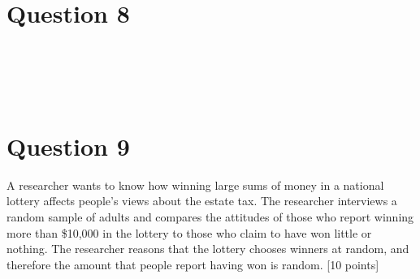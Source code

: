 \documentclass[11pt,notitlepage]{article}\usepackage[]{graphicx}\usepackage[]{color}
\makeatletter
\newenvironment{kframe}{%
 \def\at@end@of@kframe{}%
 \ifinner\ifhmode%
  \def\at@end@of@kframe{\end{minipage}}%
  \begin{minipage}{\columnwidth}%
 \fi\fi%
 \def\FrameCommand##1{\hskip\@totalleftmargin \hskip-\fboxsep
 \colorbox{shadecolor}{##1}\hskip-\fboxsep
     \hskip-\linewidth \hskip-\@totalleftmargin \hskip\columnwidth}%
 \MakeFramed {\advance\hsize-\width
   \@totalleftmargin\z@ \linewidth\hsize
   \@setminipage}}%
 {\par\unskip\endMakeFramed%
 \at@end@of@kframe}
\newenvironment{knitrout}{}{} %
\makeatother
\begin{document}
\section*{Question 8}
\begin{knitrout}
\color{fgcolor}\begin{kframe}
\begin{verbatim}





\end{verbatim}
\end{kframe}
\end{knitrout}

\section*{Question 9}
A researcher wants to know how winning large sums of money in a national lottery affects people's views about the estate tax.  The researcher interviews a random sample of adults and compares the attitudes of those who report winning more than \$10,000 in the lottery to those who claim to have won little or nothing. The researcher reasons that the lottery chooses winners at random, and therefore the amount that people report having won is random. [10 points]
\end{document}
